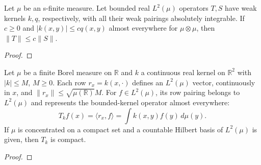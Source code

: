 \begin{supporting}
\begin{theorem}
\label{thm:dominated-weak-kernel}
\leanok
Let $\mu$ be an s-finite measure. Let bounded real $L^2(\mu)$ operators
$T,S$ have weak kernels $k,q$, respectively, with all their weak pairings
absolutely integrable. If $c\ge0$ and $|k(x,y)|\le c q(x,y)$ almost
everywhere for $\mu\otimes\mu$, then $\|T\|\le c\|S\|$.
\end{theorem}
\begin{proof}
\leanok
\end{proof}

\begin{theorem}
\label{thm:continuous-bounded-kernel-compact}
\leanok
Let $\mu$ be a finite Borel measure on $\mathbb R$ and $k$ a continuous
real kernel on $\mathbb R^2$ with $|k|\le M$, $M\ge0$.
Each row $r_x=k(x,\cdot)$ defines an $L^2(\mu)$ vector, continuously
in $x$, and $\|r_x\|\le\sqrt{\mu(\mathbb R)}M$.
For $f\in L^2(\mu)$, its row pairing belongs to $L^2(\mu)$ and represents
the bounded-kernel operator almost everywhere:
\[
 T_k f(x)=\langle r_x,f\rangle=\int k(x,y)f(y)\,d\mu(y).
\]
If $\mu$ is concentrated on a compact set and a countable Hilbert basis
of $L^2(\mu)$ is given, then $T_k$ is compact.
\end{theorem}
\begin{proof}
\leanok
\end{proof}


\end{supporting}
